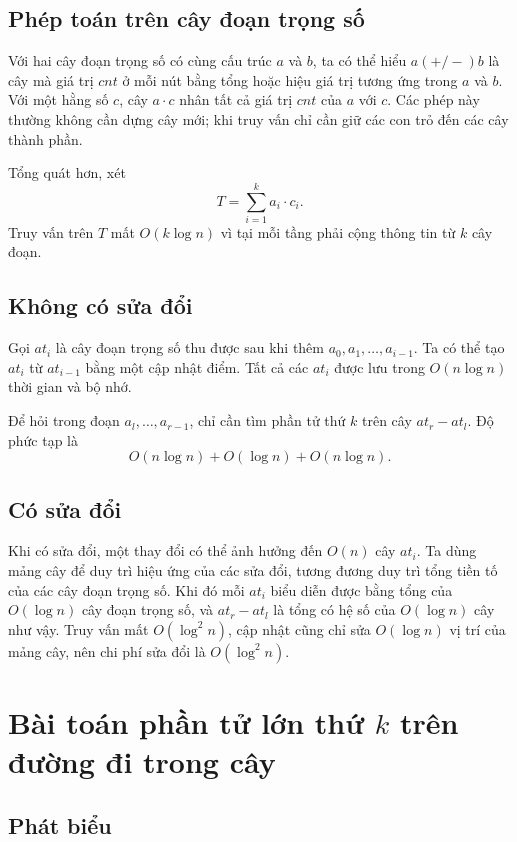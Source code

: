 \documentclass[11pt]{article}
\begin{document}
\subsection{Phép toán trên cây đoạn trọng số}

Với hai cây đoạn trọng số có cùng cấu trúc $a$ và $b$, ta có thể hiểu
$a(+/-)b$ là cây mà giá trị $cnt$ ở mỗi nút bằng tổng hoặc hiệu giá trị
tương ứng trong $a$ và $b$. Với một hằng số $c$, cây $a\cdot c$ nhân
tất cả giá trị $cnt$ của $a$ với $c$. Các phép này thường không cần
dựng cây mới; khi truy vấn chỉ cần giữ các con trỏ đến các cây thành
phần.

Tổng quát hơn, xét
\[
  T=\sum_{i=1}^{k} a_i\cdot c_i .
\]
Truy vấn trên $T$ mất $O(k\log n)$ vì tại mỗi tầng phải cộng thông tin
từ $k$ cây đoạn.

\subsection{Không có sửa đổi}

Gọi $at_i$ là cây đoạn trọng số thu được sau khi thêm
$a_0,a_1,\ldots,a_{i-1}$. Ta có thể tạo $at_i$ từ $at_{i-1}$ bằng một
cập nhật điểm. Tất cả các $at_i$ được lưu trong $O(n\log n)$ thời gian
và bộ nhớ.

Để hỏi trong đoạn $a_l,\ldots,a_{r-1}$, chỉ cần tìm phần tử thứ $k$
trên cây $at_r-at_l$. Độ phức tạp là
\[
  O(n\log n)+O(\log n)+O(n\log n).
\]

\subsection{Có sửa đổi}

Khi có sửa đổi, một thay đổi có thể ảnh hưởng đến $O(n)$ cây $at_i$.
Ta dùng mảng cây để duy trì hiệu ứng của các sửa đổi, tương đương duy
trì tổng tiền tố của các cây đoạn trọng số. Khi đó mỗi $at_i$ biểu diễn
được bằng tổng của $O(\log n)$ cây đoạn trọng số, và
$at_r-at_l$ là tổng có hệ số của $O(\log n)$ cây như vậy. Truy vấn mất
$O(\log^2 n)$, cập nhật cũng chỉ sửa $O(\log n)$ vị trí của mảng cây,
nên chi phí sửa đổi là $O(\log^2 n)$.

\section{\texorpdfstring{Bài toán phần tử lớn thứ $k$ trên đường đi trong cây}{Bài toán phần tử lớn thứ k trên đường đi trong cây}}

\subsection{Phát biểu}
\end{document}
